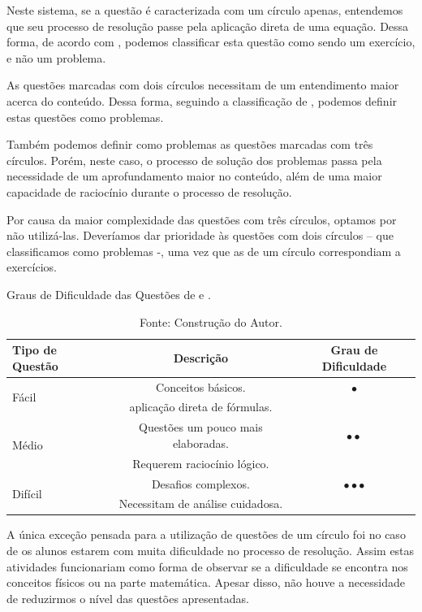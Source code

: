 Neste sistema, se a questão é caracterizada com um círculo apenas, entendemos que seu processo de resolução passe pela aplicação direta de uma equação. Dessa forma, de acordo com , podemos classificar esta questão como sendo um exercício, e não um problema.

As questões marcadas com dois círculos necessitam de um entendimento maior acerca do conteúdo. Dessa forma, seguindo a classificação de , podemos definir estas questões como problemas.

Também podemos definir como problemas as questões marcadas com três círculos. Porém, neste caso, o processo de solução dos problemas passa pela necessidade de um aprofundamento maior no conteúdo, além de uma maior capacidade de raciocínio durante o processo de resolução.

Por causa da maior complexidade das questões com três círculos, optamos por não utilizá-las. Deveríamos dar prioridade às questões com dois círculos – que classificamos como problemas -, uma vez que as de um círculo correspondiam a exercícios. 

\begin{table}[ht]
\centering
\caption{Graus de Dificuldade das Questões de  e .}
\label{tab:halliday_dificuldade}
\begin{tabular}{@{}lcc@{}}
\toprule
\textbf{Tipo de Questão} & \textbf{Descrição} & \textbf{Grau de Dificuldade} \\
\midrule
\multirow{2}{*}{Fácil} & Conceitos básicos. & $\bullet$ \\
& aplicação direta de fórmulas. & \\
\midrule
\multirow{2}{*}{Médio} & Questões um pouco mais elaboradas. & $\bullet\bullet$ \\
& Requerem raciocínio lógico. & \\
\midrule
\multirow{2}{*}{Difícil} & Desafios complexos. & $\bullet\bullet\bullet$ \\
& Necessitam de análise cuidadosa. & \\
\bottomrule
\end{tabular}
\caption*{Fonte: Construção do Autor.}
\end{table}

A única exceção pensada para a utilização de questões de um círculo foi no caso de os alunos estarem com muita dificuldade no processo de resolução. Assim estas atividades funcionariam como forma de observar se a dificuldade se encontra nos conceitos físicos ou na parte matemática. Apesar disso, não houve a necessidade de reduzirmos o nível das questões apresentadas.

